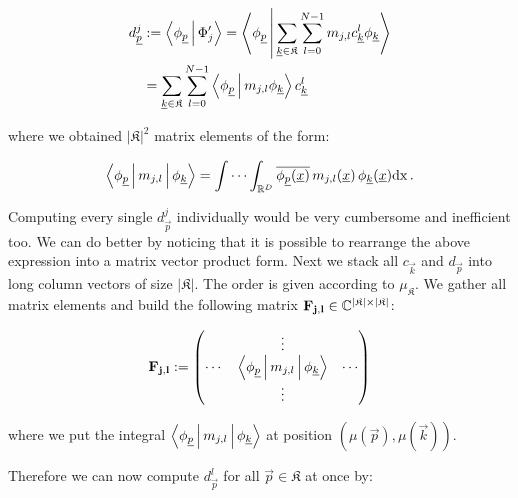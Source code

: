 \begin{align*}
  d_{\vec{p}}^j & \assign \Braket{ \phi_{\vec{p}} | \Phi_{j}^\prime}
  = \Braket{ \phi_{\vec{p}} | \sum_{\vec{k}\in\mathfrak{K}} \sum_{l=0}^{N-1} m_{j,l}  c_{\vec{k}}^l \phi_{\vec{k}} } \\
  & = \sum_{\vec{k}\in\mathfrak{K}} \sum_{l=0}^{N-1} \Braket{ \phi_{\vec{p}} | m_{j,l} \phi_{\vec{k}} } c_{\vec{k}}^l
\end{align*}

where we obtained $|\mathfrak{K}|^2$ matrix elements of the form:

\begin{equation*}
  \Braket{ \phi_{\vec{p}} | m_{j,l} | \phi_{\vec{k}} }
  = \idotsint_{\mathbb{R}^D} \conj{\phi_{\vec{p}}(\vec{x})} \, m_{j,l}(\vec{x}) \, \phi_{\vec{k}}(\vec{x}) \mathrm{dx} \,.
\end{equation*}

Computing every single $d_{\vec{p}}^j$ individually would be very cumbersome and
inefficient too. We can do better by noticing that it is possible to rearrange
the above expression into a matrix vector product form. Next we stack all
$c_{\vec{k}}$ and $d_{\vec{p}}$ into long column vectors of size $|\mathfrak{K}|$.
The order is given according to $\mu_{\mathfrak{K}}$. We gather all matrix
elements and build the following matrix $\mat{F_{j,l}} \in \mathbb{C}^{|\mathfrak{K}| \times |\mathfrak{K}|}$:

\begin{equation*}
  \mat{F_{j,l}} \assign
  \begin{pmatrix}
    {}     & \vdots                                               & {} \\
    \cdots & \Braket{ \phi_{\vec{p}} | m_{j,l} | \phi_{\vec{k}} } & \cdots \\
    {}     & \vdots                                               & {}
  \end{pmatrix}
\end{equation*}

where we put the integral $\Braket{ \phi_{\vec{p}} | m_{j,l} | \phi_{\vec{k}} }$
at position $\left(\mu(\vec{p}), \mu(\vec{k})\right)$.

Therefore we can now compute $d_{\vec{p}}^l$ for all $\vec{p} \in \mathfrak{K}$
at once by:


